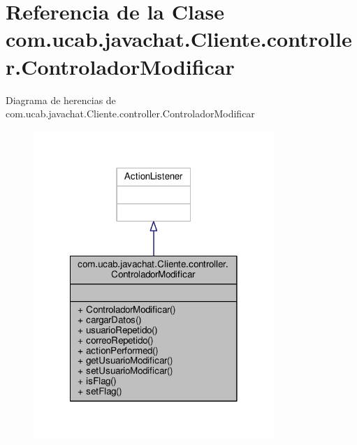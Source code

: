 \hypertarget{classcom_1_1ucab_1_1javachat_1_1_cliente_1_1controller_1_1_controlador_modificar}{\section{Referencia de la Clase com.\-ucab.\-javachat.\-Cliente.\-controller.\-Controlador\-Modificar}
\label{classcom_1_1ucab_1_1javachat_1_1_cliente_1_1controller_1_1_controlador_modificar}
}


Diagrama de herencias de com.\-ucab.\-javachat.\-Cliente.\-controller.\-Controlador\-Modificar\nopagebreak
\begin{figure}[H]
\begin{center}
\leavevmode
\includegraphics[width=258pt]{classcom_1_1ucab_1_1javachat_1_1_cliente_1_1controller_1_1_controlador_modificar__inherit__graph}
\end{center}
\end{figure}


